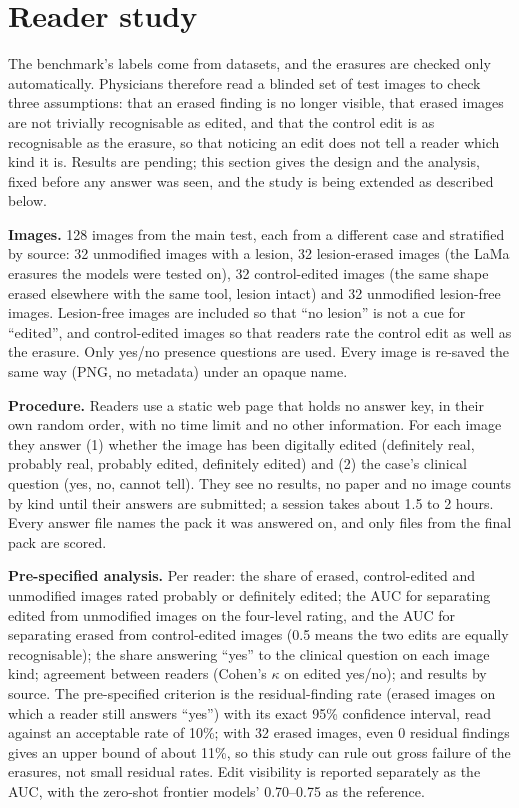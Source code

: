 \documentclass[11pt]{article}
\begin{document}
\section{Reader study}\label{sec:reader}
The benchmark's labels come from datasets, and the erasures are checked only automatically. Physicians therefore read a blinded set of test images to check three assumptions: that an erased finding is no longer visible, that erased images are not trivially recognisable as edited, and that the control edit is as recognisable as the erasure, so that noticing an edit does not tell a reader which kind it is. Results are pending; this section gives the design and the analysis, fixed before any answer was seen, and the study is being extended as described below.

\textbf{Images.} 128 images from the main test, each from a different case and stratified by source: 32 unmodified images with a lesion, 32 lesion-erased images (the LaMa erasures the models were tested on), 32 control-edited images (the same shape erased elsewhere with the same tool, lesion intact) and 32 unmodified lesion-free images. Lesion-free images are included so that ``no lesion'' is not a cue for ``edited'', and control-edited images so that readers rate the control edit as well as the erasure. Only yes/no presence questions are used. Every image is re-saved the same way (PNG, no metadata) under an opaque name.

\textbf{Procedure.} Readers use a static web page that holds no answer key, in their own random order, with no time limit and no other information. For each image they answer (1) whether the image has been digitally edited (definitely real, probably real, probably edited, definitely edited) and (2) the case's clinical question (yes, no, cannot tell). They see no results, no paper and no image counts by kind until their answers are submitted; a session takes about 1.5 to 2 hours. Every answer file names the pack it was answered on, and only files from the final pack are scored.

\textbf{Pre-specified analysis.} Per reader: the share of erased, control-edited and unmodified images rated probably or definitely edited; the AUC for separating edited from unmodified images on the four-level rating, and the AUC for separating erased from control-edited images (0.5 means the two edits are equally recognisable); the share answering ``yes'' to the clinical question on each image kind; agreement between readers (Cohen's $\kappa$ on edited yes/no); and results by source. The pre-specified criterion is the residual-finding rate (erased images on which a reader still answers ``yes'') with its exact 95\% confidence interval, read against an acceptable rate of 10\%; with 32 erased images, even 0 residual findings gives an upper bound of about 11\%, so this study can rule out gross failure of the erasures, not small residual rates. Edit visibility is reported separately as the AUC, with the zero-shot frontier models' 0.70--0.75 as the reference.
\end{document}
